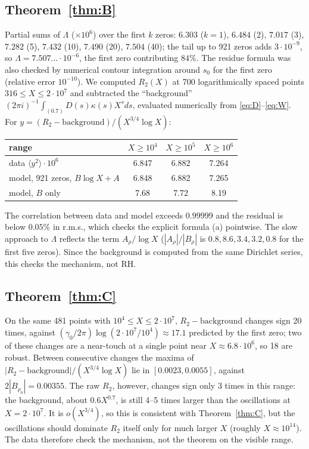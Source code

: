 \documentclass[11pt]{amsart}
\theoremstyle{remark}
\begin{document}
\subsection*{Theorem~\ref{thm:B}}
Partial sums of $\Lambda$ ($\times10^6$) over the first $k$ zeros: $6.303$ ($k=1$), $6.484$ (2), $7.017$ (3), $7.282$ (5), $7.432$ (10), $7.490$ (20), $7.504$ (40); the tail up to 921 zeros adds $3\cdot10^{-9}$, so $\Lambda=7.507\ldots\cdot10^{-6}$, the first zero contributing $84\%$. The residue formula was also checked by numerical contour integration around $s_0$ for the first zero (relative error $10^{-10}$). We computed $R_2(X)$ at 700 logarithmically spaced points $316\le X\le2\cdot10^7$ and subtracted the ``background'' $(2\pi i)^{-1}\int_{(0.7)}D(s)\kappa(s)X^sds$, evaluated numerically from \eqref{eq:D}--\eqref{eq:W}. For $y=(R_2-\text{background})/(X^{3/4}\log X)$:
\begin{center}
\begin{tabular}{lccc}
\toprule
range & $X\ge10^4$ & $X\ge10^5$ & $X\ge10^6$\\
\midrule
data $\langle y^2\rangle\cdot10^6$ & 6.847 & 6.882 & 7.264\\
model, 921 zeros, $B\log X+A$ & 6.848 & 6.882 & 7.265\\
model, $B$ only & 7.68 & 7.72 & 8.19\\
\bottomrule
\end{tabular}
\end{center}
The correlation between data and model exceeds $0.99999$ and the residual is below $0.05\%$ in r.m.s., which checks the explicit formula (a) pointwise. The slow approach to $\Lambda$ reflects the term $A_\rho/\log X$ ($|A_\rho|/|B_\rho|$ is $0.8, 8.6, 3.4, 3.2, 0.8$ for the first five zeros). Since the background is computed from the same Dirichlet series, this checks the mechanism, not RH.

\subsection*{Theorem~\ref{thm:C}}
On the same 481 points with $10^4\le X\le2\cdot10^7$, $R_2-\text{background}$ changes sign 20 times, against $(\gamma_0/2\pi)\log(2\cdot10^7/10^4)\approx17.1$ predicted by the first zero; two of these changes are a near-touch at a single point near $X\approx6.8\cdot10^6$, so 18 are robust. Between consecutive changes the maxima of $|R_2-\text{background}|/(X^{3/4}\log X)$ lie in $[0.0023,0.0055]$, against $2|B_{\rho_0}|=0.00355$. The raw $R_2$, however, changes sign only 3 times in this range: the background, about $0.6X^{0.7}$, is still 4--5 times larger than the oscillations at $X=2\cdot10^7$. It is $o(X^{3/4})$, so this is consistent with Theorem~\ref{thm:C}, but the oscillations should dominate $R_2$ itself only for much larger $X$ (roughly $X\approx10^{14}$). The data therefore check the mechanism, not the theorem on the visible range.
\end{document}
